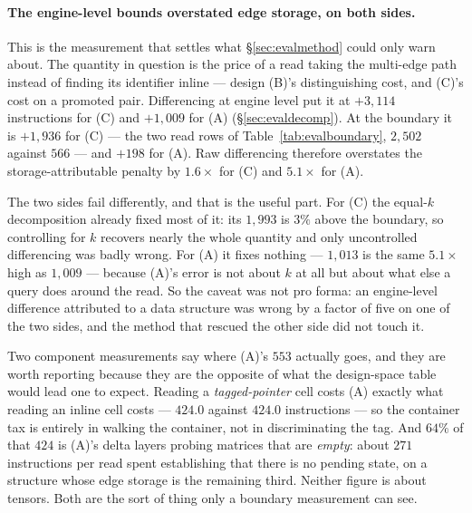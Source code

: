 \documentclass[11pt,a4paper]{article}
\theoremstyle{plain}
\theoremstyle{definition}
\theoremstyle{remark}
\begin{document}
\paragraph{The engine-level bounds overstated edge storage, on both sides.}
This is the measurement that settles what \S\ref{sec:evalmethod} could only
warn about. The quantity in question is the price of a read taking the
multi-edge path instead of finding its identifier inline --- design (B)'s
distinguishing cost, and (C)'s cost on a promoted pair. Differencing at engine
level put it at $+3{,}114$ instructions for (C) and $+1{,}009$ for (A)
(\S\ref{sec:evaldecomp}). At the boundary it is $+1{,}936$ for (C) --- the two
read rows of Table~\ref{tab:evalboundary}, $2{,}502$ against $566$ --- and
$+198$ for (A). Raw differencing therefore overstates the storage-attributable
penalty by $1.6\times$ for (C) and $5.1\times$ for (A).

The two sides fail differently, and that is the useful part. For (C) the
equal-$k$ decomposition already fixed most of it: its $1{,}993$ is $3\%$ above
the boundary, so controlling for $k$ recovers nearly the whole quantity and only
uncontrolled differencing was badly wrong. For (A) it fixes nothing --- $1{,}013$
is the same $5.1\times$ high as $1{,}009$ --- because (A)'s error is not about
$k$ at all but about what else a query does around the read. So the caveat was
not pro forma: an engine-level difference attributed to a data structure was
wrong by a factor of five on one of the two sides, and the method that rescued
the other side did not touch it.

Two component measurements say where (A)'s $553$ actually goes, and they are
worth reporting because they are the opposite of what the design-space table
would lead one to expect. Reading a \emph{tagged-pointer} cell costs (A) exactly
what reading an inline cell costs --- $424.0$ against $424.0$ instructions --- so
the container tax is entirely in walking the container, not in discriminating
the tag. And $64\%$ of that $424$ is (A)'s delta layers probing matrices that
are \emph{empty}: about $271$ instructions per read spent establishing that
there is no pending state, on a structure whose edge storage is the remaining
third. Neither figure is about tensors. Both are the sort of thing only a
boundary measurement can see.
\end{document}
